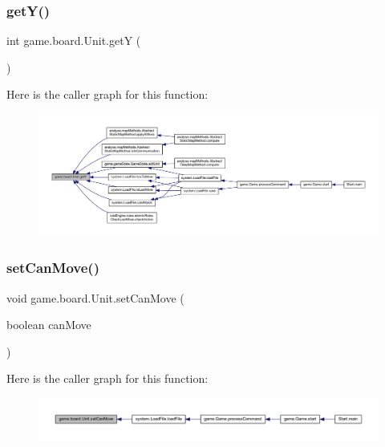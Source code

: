 \subsubsection{\texorpdfstring{get\+Y()}{getY()}}
{\footnotesize\ttfamily int game.\+board.\+Unit.\+getY (\begin{DoxyParamCaption}{ }\end{DoxyParamCaption})\hspace{0.3cm}{\ttfamily [inline]}}

Here is the caller graph for this function\+:
\nopagebreak
\begin{figure}[H]
\begin{center}
\leavevmode
\includegraphics[width=350pt]{classgame_1_1board_1_1_unit_a99a707f9342b07b4342ffec748696d27_icgraph}
\end{center}
\end{figure}
\mbox{\label{classgame_1_1board_1_1_unit_af48f7f9ba375e39248eb6ab8a3f1f6de}} 
\subsubsection{\texorpdfstring{set\+Can\+Move()}{setCanMove()}}
{\footnotesize\ttfamily void game.\+board.\+Unit.\+set\+Can\+Move (\begin{DoxyParamCaption}\item[{boolean}]{can\+Move }\end{DoxyParamCaption})\hspace{0.3cm}{\ttfamily [inline]}}

Here is the caller graph for this function\+:
\nopagebreak
\begin{figure}[H]
\begin{center}
\leavevmode
\includegraphics[width=350pt]{classgame_1_1board_1_1_unit_af48f7f9ba375e39248eb6ab8a3f1f6de_icgraph}
\end{center}
\end{figure}
\mbox{\label{classgame_1_1board_1_1_unit_a4bcf3d2f401d0245b74909e3b6716b9d}} 
